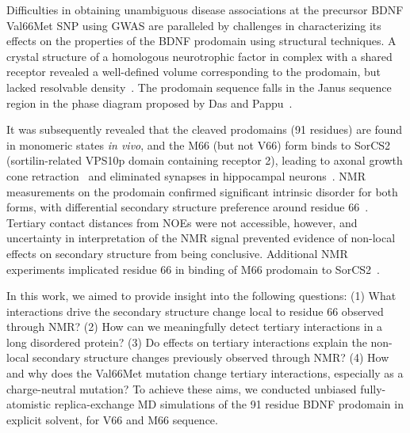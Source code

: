 \documentclass[10pt,letterpaper]{article}
\begin{document}
Difficulties in obtaining unambiguous disease associations at the precursor BDNF Val66Met SNP using GWAS are paralleled by challenges in characterizing its effects on the properties of the BDNF prodomain using structural techniques. A crystal structure of a homologous neurotrophic factor in complex with a shared receptor revealed a well-defined volume corresponding to the prodomain, but lacked resolvable density~\cite{Feng2010a}. The prodomain sequence falls in the Janus sequence region in the phase diagram proposed by Das and Pappu~\cite{Das2015,Das2013}. 

It was subsequently revealed that the cleaved prodomains (91 residues) are found in monomeric states {\it in vivo}, and the M66 (but not V66) form binds to SorCS2 (sortilin-related VPS10p domain containing receptor 2), leading to axonal growth cone retraction~\cite{Anastasia2013} and eliminated synapses in hippocampal neurons~\cite{Giza2018}. NMR measurements on the prodomain confirmed significant intrinsic disorder for both forms, with differential secondary structure preference around residue 66~\cite{Anastasia2013}. Tertiary contact distances from NOEs were not accessible, however, and uncertainty in interpretation of the NMR signal prevented evidence of non-local effects on secondary structure from being conclusive. Additional NMR experiments implicated residue 66 in binding of M66 prodomain to SorCS2~\cite{Anastasia2013}.
 
In this work, we aimed to provide insight into the following questions: (1) What interactions drive the secondary structure change local to residue 66 observed through NMR? (2) How can we meaningfully detect tertiary interactions in a long disordered protein? (3) Do effects on tertiary interactions explain the non-local secondary structure changes previously observed through NMR? (4) How and why does the Val66Met mutation change tertiary interactions, especially as a charge-neutral mutation? To achieve these aims, we conducted unbiased fully-atomistic replica-exchange MD simulations of the 91 residue BDNF prodomain in explicit solvent, for V66 and M66 sequence.
\end{document}
